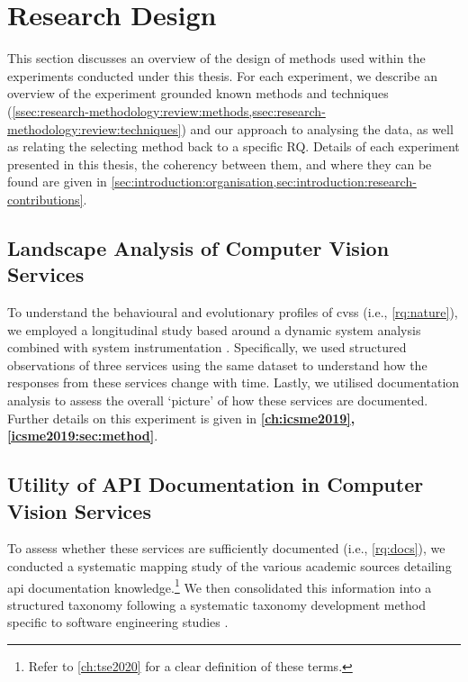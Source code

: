 \section{Research Design}
\label{sec:research-methodology:experiments}

This section discusses an overview of the design of methods used within the experiments conducted under this thesis. For each experiment, we describe an overview of the experiment grounded known methods and techniques (\cref{ssec:research-methodology:review:methods,ssec:research-methodology:review:techniques}) and our approach to analysing the data, as well as relating the selecting method back to a specific RQ. Details of each experiment presented in this thesis, the coherency between them, and where they can be found are given in \cref{sec:introduction:organisation,sec:introduction:research-contributions}.

\subsection{Landscape Analysis of Computer Vision Services}

To understand the behavioural and evolutionary profiles of \glspl{cvs} (i.e., \ref{rq:nature}), we employed a longitudinal study based around a dynamic system analysis combined with system instrumentation \citep{Singer:2007tu}. Specifically, we used structured observations of three services using the same dataset to understand how the responses from these services change with time. Lastly, we utilised documentation analysis to assess the overall `picture' of how these services are documented. Further details on this experiment is given in \textbf{\cref{ch:icsme2019}, \cref{icsme2019:sec:method}}.

\subsection{Utility of API Documentation in Computer Vision Services}

To assess whether these services are sufficiently documented (i.e., \ref{rq:docs}), we conducted a systematic mapping study \citep{Kitchenham:2007dd,Petersen:2008td} of the various academic sources detailing \gls{api} documentation knowledge.\footnote{Refer to \cref{ch:tse2020} for a clear definition of these terms.} We then consolidated this information into a structured taxonomy following a systematic taxonomy development method specific to software engineering studies \citep{Usman:2017hn}.

